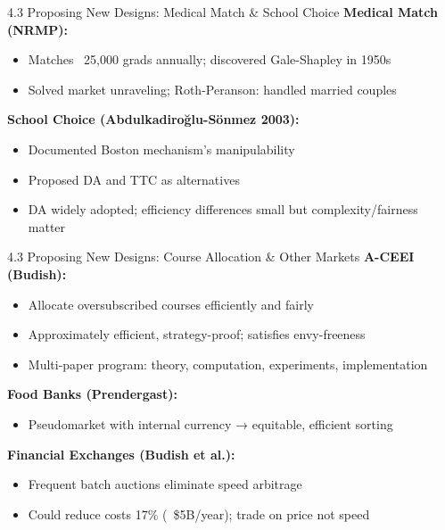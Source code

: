 \documentclass{beamer}
\begin{document}
\begin{frame}{4.3 Proposing New Designs: Medical Match \& School Choice}
\textbf{Medical Match (NRMP):}
\begin{itemize}
    \item Matches ~25,000 grads annually; discovered Gale-Shapley in 1950s
    \item Solved market unraveling; Roth-Peranson: handled married couples
\end{itemize}

\vspace{0.3cm}
\textbf{School Choice (Abdulkadiroğlu-Sönmez 2003):}
\begin{itemize}
    \item Documented Boston mechanism's manipulability
    \item Proposed DA and TTC as alternatives
    \item DA widely adopted; efficiency differences small but complexity/fairness matter
\end{itemize}
\end{frame}

\begin{frame}{4.3 Proposing New Designs: Course Allocation \& Other Markets}
\textbf{A-CEEI (Budish):}
\begin{itemize}
    \item Allocate oversubscribed courses efficiently and fairly
    \item Approximately efficient, strategy-proof; satisfies envy-freeness
    \item Multi-paper program: theory, computation, experiments, implementation
\end{itemize}

\vspace{0.3cm}
\textbf{Food Banks (Prendergast):}
\begin{itemize}
    \item Pseudomarket with internal currency → equitable, efficient sorting
\end{itemize}

\vspace{0.3cm}
\textbf{Financial Exchanges (Budish et al.):}
\begin{itemize}
    \item Frequent batch auctions eliminate speed arbitrage
    \item Could reduce costs 17\% (~\$5B/year); trade on price not speed
\end{itemize}
\end{frame}
\end{document}
